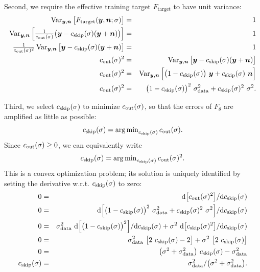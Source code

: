 Second, we require the effective training target $F_\text{target}$ to have unit variance:
\begin{eqnarray}
  \operatorname{Var}_{\boldsymbol{y}, \boldsymbol{n}} \big[ F_\text{target}(\boldsymbol{y}, \boldsymbol{n}; \sigma) \big] &=& 1 \\
  \operatorname{Var}_{\boldsymbol{y}, \boldsymbol{n}} \Big[ \tfrac{1}{c_\text{out}(\sigma)} \big( \boldsymbol{y} - c_\text{skip}(\sigma) (\boldsymbol{y} + \boldsymbol{n}) \big) \Big] &=& 1 \\
  \tfrac{1}{c_\text{out}(\sigma)^2} \operatorname{Var}_{\boldsymbol{y}, \boldsymbol{n}} \big[ \boldsymbol{y} - c_\text{skip}(\sigma) (\boldsymbol{y} + \boldsymbol{n}) \big] &=& 1 \\
  c_\text{out}(\sigma)^2 &=& \operatorname{Var}_{\boldsymbol{y}, \boldsymbol{n}} \big[ \boldsymbol{y} - c_\text{skip}(\sigma) (\boldsymbol{y} + \boldsymbol{n}) \big] \\
  c_\text{out}(\sigma)^2 &=& \operatorname{Var}_{\boldsymbol{y}, \boldsymbol{n}} \Big[ \big( 1 - c_\text{skip}(\sigma) \big) ~\boldsymbol{y} + c_\text{skip}(\sigma) ~\boldsymbol{n} \Big] \\
  c_\text{out}(\sigma)^2 &=& \big( 1 - c_\text{skip}(\sigma) \big)^2 ~\sigma_\text{data}^2 + c_\text{skip}(\sigma)^2 ~\sigma^2
  \label{eq:coutpre}
  \text{.}
\end{eqnarray}

Third, we select $c_\text{skip}(\sigma)$ to minimize $c_\text{out}(\sigma)$, so that the errors of $F_\theta$ are amplified as little as possible:
\begin{equation}
  c_\text{skip}(\sigma) = \operatorname{arg\,min}_{c_\text{skip}(\sigma)} c_\text{out}(\sigma)
  \text{.}
\end{equation}
Since $c_\text{out}(\sigma) \ge 0$, we can equivalently write
\begin{equation}
  c_\text{skip}(\sigma) = \operatorname{arg\,min}_{c_\text{skip}(\sigma)} c_\text{out}(\sigma)^2
  \text{.}
\end{equation}
This is a convex optimization problem; its solution is uniquely identified by setting the derivative w.r.t. $c_\text{skip}(\sigma)$ to zero:
\begin{eqnarray}
  0 &=& \mathrm{d}\big[ c_\text{out}(\sigma)^2 \big] / \mathrm{d}c_\text{skip}(\sigma) \\
  0 &=& \mathrm{d}\Big[ \big(1 - c_\text{skip}(\sigma)\big)^2 ~\sigma_\text{data}^2 + c_\text{skip}(\sigma)^2 ~\sigma^2 \Big] / \mathrm{d}c_\text{skip}(\sigma) \\
  0 &=& \sigma_\text{data}^2 ~\mathrm{d} \Big[ \big(1 - c_\text{skip}(\sigma)\big)^2 \Big] / \mathrm{d}c_\text{skip}(\sigma) + \sigma^2 ~\mathrm{d}\big[c_\text{skip}(\sigma)^2 \big] / \mathrm{d} c_\text{skip}(\sigma) \\
  0 &=& \sigma_\text{data}^2 ~\big[ 2 ~c_\text{skip}(\sigma) - 2 \big] + \sigma^2 ~\big[ 2 ~c_\text{skip}(\sigma) \big] \\
  0 &=& \big( \sigma^2 + \sigma_\text{data}^2 \big) ~c_\text{skip}(\sigma) - \sigma_\text{data}^2 \\
  c_\text{skip}(\sigma) &=& \sigma_\text{data}^2 / \big( \sigma^2 + \sigma_\text{data}^2 \big)
  \label{eq:cskip}
  \text{.}
\end{eqnarray}

